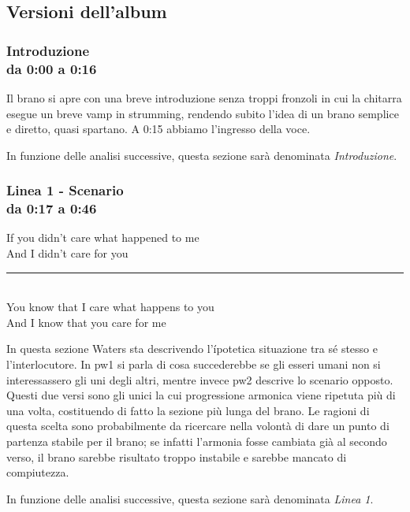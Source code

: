 \documentclass[class=book, crop=false, oneside, 12pt]{standalone}
\begin{document}
    \subsection{Versioni dell'album}
    
    \subsubsection*{Introduzione\\ \small{da 0:00 a 0:16}}
    Il brano si apre con una breve introduzione senza troppi fronzoli in cui la chitarra esegue un breve vamp in strumming, rendendo subito l'idea di un brano semplice e diretto, quasi spartano. A 0:15 abbiamo l'ingresso della voce.
    
    In funzione delle analisi successive, questa sezione sarà denominata \emph{Introduzione}.

    \subsubsection*{Linea 1 - Scenario\\ \small{da 0:17 a 0:46}}
    \begin{displayquote}
        If you didn't care what happened to me \\
        And I didn't care for you \\ 
        \vspace{0pt}
        \rule{.4\linewidth}{.5pt} \\ %
        You know that I care what happens to you \\
        And I know that you care for me 
    \end{displayquote}
    In questa sezione Waters sta descrivendo l'ípotetica situazione tra sé stesso e l'interlocutore. In \acrshort{pw1} si parla di cosa succederebbe se gli esseri umani non si interessassero gli uni degli altri, mentre invece \acrshort{pw2} descrive lo scenario opposto. Questi due versi sono gli unici la cui progressione armonica viene ripetuta più di una volta, costituendo di fatto la sezione più lunga del brano. Le ragioni di questa scelta sono probabilmente da ricercare nella volontà di dare un punto di partenza stabile per il brano; se infatti l'armonia fosse cambiata già al secondo verso, il brano sarebbe risultato troppo instabile e sarebbe mancato di compiutezza.

    In funzione delle analisi successive, questa sezione sarà denominata \emph{Linea 1}.
    
\end{document}
